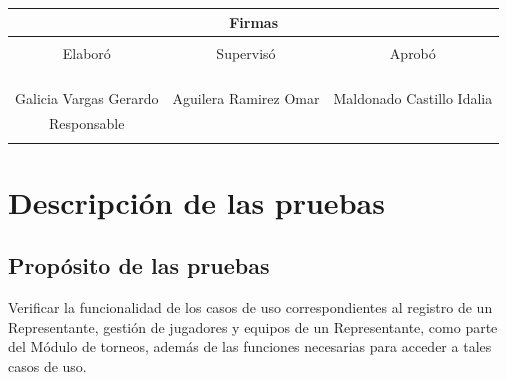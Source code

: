 \documentclass[oneside,10pt]{book}
\begin{document}
\begin{table}[]
\centering
\label{my-label}
\begin{tabularx}{\textwidth}{ X X X }
\multicolumn{3}{c}{\cellcolor[HTML]{CBCEFB}Firmas}                                                                                         \\ \hline
\multicolumn{1}{|X|}{ } & \multicolumn{1}{X|}{ } & \multicolumn{1}{X|}{ } \\
\multicolumn{1}{|c|}{Elaboró} 		& \multicolumn{1}{c|}{Supervisó}                   		& \multicolumn{1}{c|}{Aprobó} \\
\multicolumn{1}{|X|}{ } & \multicolumn{1}{X|}{ } & \multicolumn{1}{X|}{ } \\
\multicolumn{1}{|X|}{ } & \multicolumn{1}{X|}{ } & \multicolumn{1}{X|}{ } \\
\multicolumn{1}{|X|}{ } & \multicolumn{1}{X|}{ } & \multicolumn{1}{X|}{ } \\
\multicolumn{1}{|X|}{ } & \multicolumn{1}{X|}{ } & \multicolumn{1}{X|}{ } \\ \hline
\multicolumn{1}{|c|}{Galicia Vargas Gerardo}   	& \multicolumn{1}{c|}{Aguilera Ramirez Omar} 	& \multicolumn{1}{c|}{Maldonado Castillo Idalia} 	\\
\multicolumn{1}{|c|}{Responsable}   	& \multicolumn{1}{c|}{ } 	& \multicolumn{1}{c|}{ } \\
\multicolumn{1}{|X|}{ } & \multicolumn{1}{X|}{ } & \multicolumn{1}{X|}{ } \\ \hline
\end{tabularx}
\end{table}

\thispagestyle{empty}

\frontmatter
\tableofcontents

\mainmatter

\chapter{Descripción de las pruebas}

\section{Propósito de las pruebas}

	Verificar la funcionalidad de los casos de uso correspondientes al registro de un Representante, gestión de jugadores y equipos de un Representante, como parte del Módulo de torneos, además de las funciones necesarias para acceder a tales casos de uso.
\end{document}
